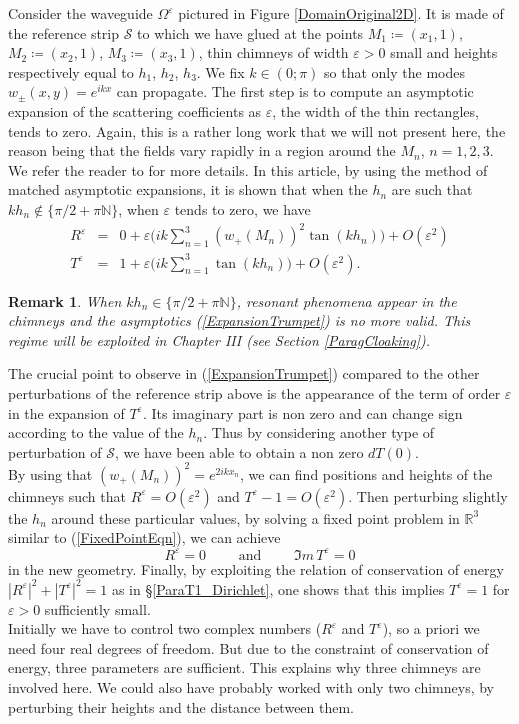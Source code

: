 \documentclass[11pt,a4paper]{report}
\newcommand{\dsp}{\displaystyle}
\newcommand{\eps}{\varepsilon}
\newcommand{\Om}{\Omega}
\newcommand{\N}{\mathbb{N}}
\newcommand{\R}{\mathbb{R}}
\newtheorem{remark}[theorem]{Remark}
\begin{document}
\noindent Consider the waveguide $\Om^\eps$ pictured in Figure \ref{DomainOriginal2D}. It is made of the reference strip $\mathcal{S}$ to which we have glued at the points $M_1\coloneqq(x_1,1)$, $M_2\coloneqq(x_2,1)$, $M_3\coloneqq(x_3,1)$, thin chimneys of width $\eps>0$ small and heights respectively equal to $h_1$, $h_2$, $h_3$. We fix $k\in(0;\pi)$ so that only the modes $w_\pm(x,y)=e^{ikx}$ can propagate. The first step is to compute an asymptotic expansion of the scattering coefficients as $\eps$, the width of the thin rectangles, tends to zero. Again, this is a rather long work that we will not present here, the reason being that the fields vary rapidly in a region around the $M_n$, $n=1,2,3$. We refer the reader to \cite{BoCN18} for more details. In this article, by using the method of matched asymptotic expansions, it is shown that when the $h_n$ are such that $kh_n\not\in\{\pi/2+\pi\N\}$, when $\eps$ tends to zero, we have
\begin{equation}\label{ExpansionTrumpet}
\begin{array}{rcl}
R^\eps &=& \dsp0+\eps\Big(ik\sum_{n=1}^3(w_+(M_n))^2\tan(kh_n)\Big)+O(\eps^2) \\[10pt]
T^\eps &=& \dsp1+\eps\Big(ik\sum_{n=1}^3\tan(kh_n)\Big)+O(\eps^2).
\end{array}
\end{equation}

\begin{remark}
When $kh_n\in\{\pi/2+\pi\N\}$, resonant phenomena appear in the chimneys and the asymptotics (\ref{ExpansionTrumpet}) is no more valid. This regime will be exploited in Chapter III (see Section \ref{ParagCloaking}).
\end{remark}

\noindent The crucial point to observe in (\ref{ExpansionTrumpet}) compared to the other perturbations of the reference strip above is the appearance of the term of order $\eps$ in the expansion of $T^\eps$. Its imaginary part is non zero and can change sign according to the value of the $h_n$. Thus by considering another type of perturbation of $\mathcal{S}$, we have been able to obtain a non zero $dT(0)$.\\
\newline
By using that $(w_+(M_n))^2=e^{2ikx_n}$, we can find positions and heights of the chimneys such that $R^\eps=O(\eps^2)$ and $T^\eps-1=O(\eps^2)$. Then perturbing slightly the $h_n$ around these particular values, by solving a fixed point problem in $\R^3$ similar to (\ref{FixedPointEqn}), we can achieve 
\[
R^\eps=0\qquad\mbox{ and }\qquad\Im m\,T^\eps=0
\]
in the new geometry. Finally, by exploiting the relation of conservation of energy $|R^\eps|^2+|T^\eps|^2=1$ as in \S\ref{ParaT1_Dirichlet}, one shows that this implies $T^\eps=1$ for $\eps>0$ sufficiently small.\\
\newline
Initially we have to control two complex numbers ($R^\eps$ and $T^\eps$), so a priori we need four real degrees of freedom. But due to the constraint of conservation of energy, three parameters are sufficient. This explains why three chimneys are involved here. We could also have probably worked with only two chimneys, by perturbing their heights and the distance between them. 
\end{document}
